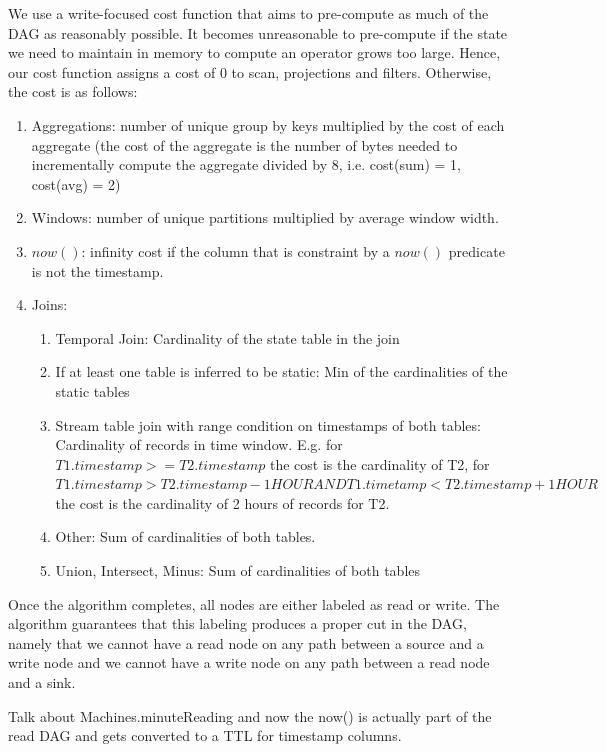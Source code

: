 \documentclass[	DIV=calc,%
							paper=letter,%
							fontsize=11pt,%
							twocolumn]{scrartcl}	 					%
\begin{document}
 We use a write-focused cost function that aims to pre-compute as much of the DAG as reasonably possible. It becomes unreasonable to pre-compute if the state we need to maintain in memory to compute an operator grows too large. Hence, our cost function assigns a cost of 0 to scan, projections and filters. Otherwise, the cost is as follows:
 \begin{enumerate}
     \item Aggregations: number of unique group by keys multiplied by the cost of each aggregate (the cost of the aggregate is the number of bytes needed to incrementally compute the aggregate divided by 8, i.e. cost(sum) = 1, cost(avg) = 2)
     \item Windows: number of unique partitions multiplied by average window width.
     \item $now()$: infinity cost if the column that is constraint by a $now()$ predicate is not the timestamp.
     \item Joins:
     \begin{enumerate}
         \item Temporal Join: Cardinality of the state table in the join
         \item If at least one table is inferred to be static: Min of the cardinalities of the static tables
         \item Stream table join with range condition on timestamps of both tables: Cardinality of records in time window. E.g. for $T1.timestamp >= T2.timestamp$ the cost is the cardinality of T2, for $T1.timestamp > T2.timestamp - 1 HOUR AND T1.timetamp < T2.timestamp + 1 HOUR$ the cost is the cardinality of 2 hours of records for T2.
         \item Other: Sum of cardinalities of both tables.
     \item Union, Intersect, Minus: Sum of cardinalities of both tables
     \end{enumerate}
 \end{enumerate}

Once the algorithm completes, all nodes are either labeled as read or write. The algorithm guarantees that this labeling produces a proper cut in the DAG, namely that we cannot have a read node on any path between a source and a write node and we cannot have a write node on any path between a read node and a sink.

Talk about Machines.minuteReading and now the now() is actually part of the read DAG and gets converted to a TTL for timestamp columns.
\end{document}
